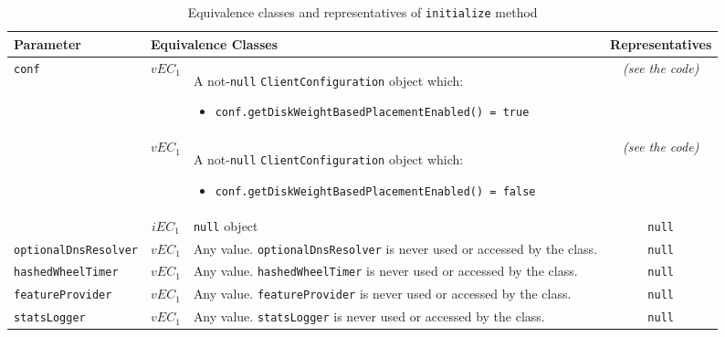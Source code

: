 \documentclass[sigconf]{acmart}
\begin{document}
\begin{table*}
\footnotesize
\caption{Equivalence classes and representatives of \texttt{initialize} method}
\label{initializeEq}
\centering
\begin{tabular}{l|cm{10.5cm}|c}
\toprule
 
\textbf{Parameter} & \multicolumn{2}{|l|}{\textbf{Equivalence Classes}} & \textbf{Representatives} \\
\midrule
    
\texttt{conf} & $vEC_1$ & A not-\texttt{null} \texttt{ClientConfiguration} object which:

\begin{itemize}
\item \texttt{conf.getDiskWeightBasedPlacementEnabled() = true}
\end{itemize}

 & \textit{(see the code)}

\\\cline{2-4} 

& $vEC_1$ & A not-\texttt{null} \texttt{ClientConfiguration} object which:

\begin{itemize}
\item \texttt{conf.getDiskWeightBasedPlacementEnabled() = false}
\end{itemize}

& \textit{(see the code)}

\\\cline{2-4}

& $iEC_1$ & \texttt{null} object & \texttt{null}

\\\hline

\texttt{optionalDnsResolver} & $vEC_1$ & Any value. \texttt{optionalDnsResolver} is never used or accessed by the class. & \texttt{null}

\\\hline

\texttt{hashedWheelTimer} & $vEC_1$ & Any value. \texttt{hashedWheelTimer} is never used or accessed by the class. & \texttt{null}

\\\hline

\texttt{featureProvider} & $vEC_1$ & Any value. \texttt{featureProvider} is never used or accessed by the class. & \texttt{null}

\\\hline

\texttt{statsLogger} & $vEC_1$ & Any value. \texttt{statsLogger} is never used or accessed by the class. & \texttt{null}

\\

\bottomrule
\end{tabular}
\end{table*}
\end{document}
